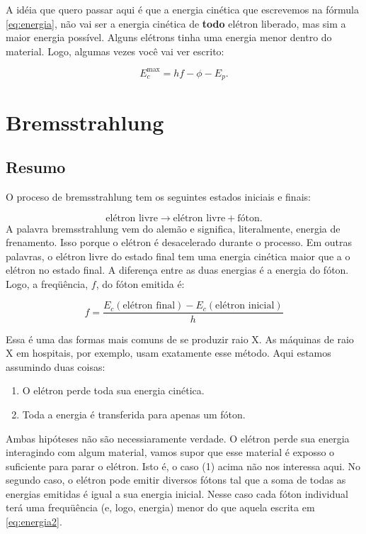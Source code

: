 \documentclass{article}
\begin{document}
A id\'eia que quero passar aqui \'e que a energia cin\'etica que escrevemos na f\'ormula \eqref{eq:energia}, n\~ao vai ser a energia cin\'etica de \textbf{todo} el\'etron liberado, mas sim a maior energia poss\'ivel. Alguns el\'etrons tinha uma energia menor dentro do material. Logo, algumas vezes voc\^e vai ver escrito:

\begin{equation}
E_c^{\text{max}} = hf - \phi - E_p.
\end{equation}

\section{Bremsstrahlung}

\subsection{Resumo}
O proceso de bremsstrahlung tem os seguintes estados iniciais e finais:

\begin{equation}
\text{el\'etron livre} \rightarrow \text{el\'etron livre} + \text{f\'oton}.
\end{equation}
A palavra bremsstrahlung vem do alem\~ao e significa, literalmente, energia de frenamento. Isso porque o el\'etron \'e desacelerado durante o processo. Em outras palavras, o el\'etron livre do estado final tem uma energia cin\'etica maior que a o el\'etron no estado final. A diferen\c ca entre as duas energias \'e a energia do f\'oton. Logo, a freq\"u\^encia, $f$, do f\'oton emitida \'e:

\begin{equation}\label{eq:energia2}
f = \frac{E_c(\text{el\'etron final})-E_c(\text{el\'etron inicial})}{h}
\end{equation}

Essa \'e uma das formas mais comuns de se produzir raio X. As m\'aquinas de raio X em hospitais, por exemplo, usam exatamente esse m\'etodo. Aqui estamos assumindo duas coisas:

\begin{enumerate}
\item O el\'etron perde toda sua energia cin\'etica.
\item Toda a energia \'e transferida para apenas um f\'oton.
\end{enumerate}
Ambas hip\'oteses n\~ao s\~ao necessiaramente verdade. O el\'etron perde sua energia interagindo com algum material, vamos supor que esse material \'e exposso o suficiente para parar o el\'etron. Isto \'e, o caso (1) acima n\~ao nos interessa aqui. No segundo caso, o el\'etron pode emitir diversos f\'otons tal que a soma de todas as energias emitidas \'e igual a sua energia inicial. Nesse caso cada f\'oton individual ter\'a uma frequ\"u\^encia (e, logo, energia) menor do que aquela escrita em \eqref{eq:energia2}.
\end{document}

